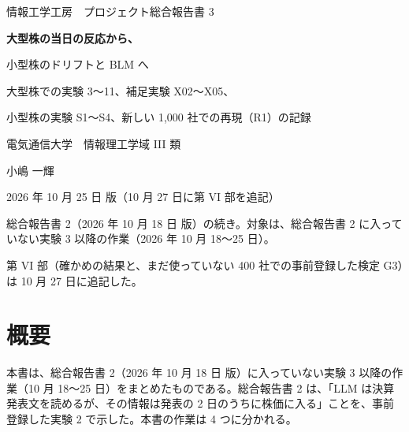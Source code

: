 \documentclass[xelatex,ja=standard,jafont=haranoaji,a4paper,10pt]{bxjsreport}
\begin{document}
\begin{titlepage}
\centering
\vspace*{30mm}
{\sffamily\Large 情報工学工房　プロジェクト総合報告書 3\par}
\vspace{14mm}
{\sffamily\bfseries\huge 大型株の当日の反応から、\par\vspace{3mm}小型株のドリフトと BLM へ\par}
\vspace{12mm}
{\large 大型株での実験 3〜11、補足実験 X02〜X05、\par\vspace{2mm}小型株の実験 S1〜S4、新しい 1,000 社での再現（R1）の記録\par}
\vspace{30mm}
{\large 電気通信大学　情報理工学域 III 類\par}
\vspace{3mm}
{\Large 小嶋 一輝\par}
\vspace{20mm}
{\large 2026 年 10 月 25 日 版（10 月 27 日に第 VI 部を追記）\par}
\vfill
{\small 総合報告書 2（2026 年 10 月 18 日 版）の続き。対象は、総合報告書 2 に入っていない実験 3 以降の作業（2026 年 10 月 18〜25 日）。\par
\small 第 VI 部（確かめの結果と、まだ使っていない 400 社での事前登録した検定 G3）は 10 月 27 日に追記した。\par}
\end{titlepage}
\hypersetup{pageanchor=true}

\chapter*{概要}

本書は、総合報告書 2（2026 年 10 月 18 日 版）に入っていない実験 3 以降の作業（10 月 18〜25 日）をまとめたものである。総合報告書 2 は、「LLM は決算発表文を読めるが、その情報は発表の 2 日のうちに株価に入る」ことを、事前登録した実験 2 で示した。本書の作業は 4 つに分かれる。
\end{document}

